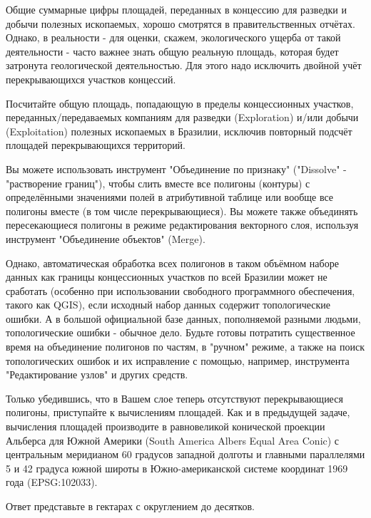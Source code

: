 
Общие суммарные цифры площадей, переданных в концессию для разведки и добычи полезных ископаемых, хорошо смотрятся в правительственных отчётах. Однако, в реальности - для оценки, скажем, экологического ущерба от такой деятельности - часто важнее знать общую реальную площадь, которая будет затронута геологической деятельностью. Для этого надо исключить двойной учёт перекрывающихся участков концессий.

Посчитайте общую площадь, попадающую в пределы концессионных участков, переданных/передаваемых компаниям 
для разведки (Exploration) и/или добычи \linebreak (Exploitation) полезных ископаемых в Бразилии, исключив повторный подсчёт площадей перекрывающихся территорий.

Вы можете использовать инструмент "Объединение по признаку" ("Dissolve" - "растворение границ"), чтобы слить вместе все полигоны (контуры) с определёнными значениями полей в атрибутивной таблице или вообще все полигоны вместе (в том числе перекрывающиеся). Вы можете также объединять пересекающиеся полигоны в режиме редактирования векторного слоя, используя инструмент "Объединение объектов" (Merge).

Однако, автоматическая обработка всех полигонов в таком объёмном наборе данных как границы концессионных участков по всей Бразилии может не сработать (особенно при использовании свободного программного обеспечения, такого как QGIS), если исходный набор данных содержит топологические ошибки. А в большой официальной базе данных, пополняемой разными людьми, топологические ошибки - обычное дело. Будьте готовы потратить существенное время на объединение полигонов по частям, в "ручном" режиме, а также на поиск топологических ошибок и их исправление с помощью, например, инструмента "Редактирование узлов" и других средств.

Только убедившись, что в Вашем слое теперь отсутствуют перекрывающиеся полигоны, приступайте к вычислениям площадей. Как и в предыдущей задаче, вычисления площадей производите в равновеликой конической проекции Альберса для Южной Америки (South America Albers Equal Area Conic) с центральным меридианом 60 градусов западной долготы и главными параллелями 5 и 42 градуса южной широты в Южно-американской системе координат 1969 года (EPSG:102033).

Ответ представьте в гектарах с округлением до десятков.

